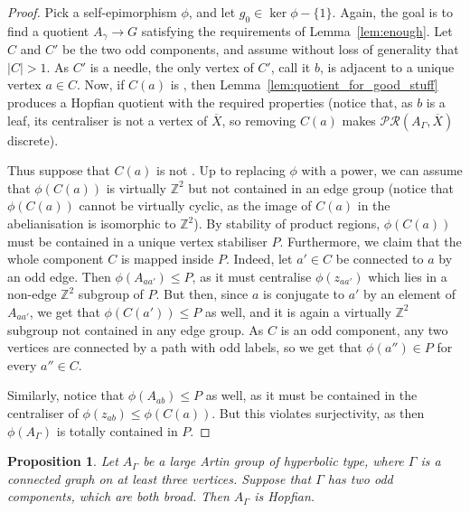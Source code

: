 \documentclass[svgnames]{amsart}
\theoremstyle{plain}
\newtheorem{prop}[thm]{Proposition}
\theoremstyle{definition}
\newcommand{\Z}{\mathbb{Z}}
\newcommand{\ov}[1]{\overline{#1}}
\begin{document}
\begin{proof} Pick a self-epimorphism $\phi$, and let $g_0\in \ker\phi-\{1\}$. Again, the goal is to find a quotient $A_\gamma\to G$ satisfying the requirements of Lemma~\ref{lem:enough}. Let $C$ and $C'$ be the two odd components, and assume without loss of generality that $|C|>1$. As $C'$ is a needle, the only vertex of $C'$, call it $b$, is adjacent to a unique vertex $a\in C$. Now, if $C(a)$ is \good{}, then Lemma~\ref{lem:quotient_for_good_stuff} produces a Hopfian quotient with the required properties (notice that, as $b$ is a leaf, its centraliser is not a vertex of $\ov X$, so removing $C(a)$ makes $\mathcal{PR}(A_\Gamma, \ov X)$ discrete). 
\par\medskip

Thus suppose that $C(a)$ is not \good{}. Up to replacing $\phi$ with a power, we can assume that $\phi(C(a))$ is virtually $\Z^2$ but not contained in an edge group (notice that $\phi(C(a))$ cannot be virtually cyclic, as the image of $C(a)$ in the abelianisation is isomorphic to $\Z^2$). By stability of product regions, $\phi(C(a))$ must be contained in a unique vertex stabiliser $P$. Furthermore, we claim that the whole component $C$ is mapped inside $P$. Indeed, let $a'\in C$ be connected to $a$ by an odd edge. Then $\phi(A_{aa'})\le P$, as it must centralise $\phi(z_{aa'})$ which lies in a non-edge $\Z^2$ subgroup of $P$. But then, since $a$ is conjugate to $a'$ by an element of $A_{aa'}$, we get that $\phi(C(a'))\le P$ as well, and it is again a virtually $\Z^2$ subgroup not contained in any edge group. As $C$ is an odd component, any two vertices are connected by a path with odd labels, so we get that $\phi(a'')\in P$ for every $a''\in C$.

Similarly, notice that $\phi(A_{ab})\le P$ as well, as it must be contained in the centraliser of $\phi(z_{ab})\le \phi(C(a))$. But this violates surjectivity, as then $\phi(A_\Gamma)$ is totally contained in $P$.
\end{proof}


\begin{prop}\label{prop:2_odd_broad}
    Let $A_\Gamma$ be a large Artin group of hyperbolic type, where $\Gamma$ is a connected graph on at least three vertices. Suppose that $\Gamma$ has two odd components, which are both broad. Then $A_\Gamma$ is Hopfian.
\end{prop}
\end{document}
